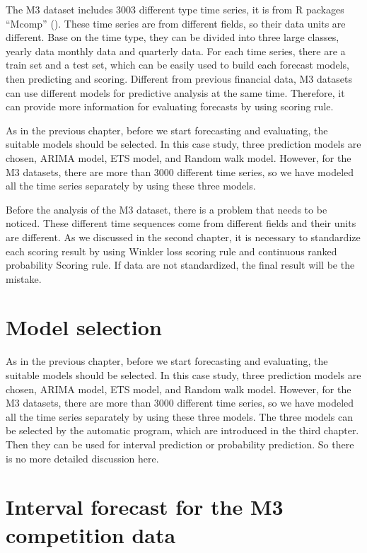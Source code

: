 \documentclass{monashthesis}
\theoremstyle{definition}
\theoremstyle{definition}
\theoremstyle{definition}
\theoremstyle{remark}
\begin{document}
The M3 dataset includes 3003 different type time series, it is from R
packages ``Mcomp'' (\textcite{RH182}). These time series are from
different fields, so their data units are different. Base on the time
type, they can be divided into three large classes, yearly data monthly
data and quarterly data. For each time series, there are a train set and
a test set, which can be easily used to build each forecast models, then
predicting and scoring. Different from previous financial data, M3
datasets can use different models for predictive analysis at the same
time. Therefore, it can provide more information for evaluating
forecasts by using scoring rule.

As in the previous chapter, before we start forecasting and evaluating,
the suitable models should be selected. In this case study, three
prediction models are chosen, ARIMA model, ETS model, and Random walk
model. However, for the M3 datasets, there are more than 3000 different
time series, so we have modeled all the time series separately by using
these three models.

Before the analysis of the M3 dataset, there is a problem that needs to
be noticed. These different time sequences come from different fields
and their units are different. As we discussed in the second chapter, it
is necessary to standardize each scoring result by using Winkler loss
scoring rule and continuous ranked probability Scoring rule. If data are
not standardized, the final result will be the mistake.

\section{Model selection}\label{model-selection}

As in the previous chapter, before we start forecasting and evaluating,
the suitable models should be selected. In this case study, three
prediction models are chosen, ARIMA model, ETS model, and Random walk
model. However, for the M3 datasets, there are more than 3000 different
time series, so we have modeled all the time series separately by using
these three models. The three models can be selected by the automatic
program, which are introduced in the third chapter. Then they can be
used for interval prediction or probability prediction. So there is no
more detailed discussion here.

\section{Interval forecast for the M3 competition
data}\label{interval-forecast-for-the-m3-competition-data}
\end{document}
